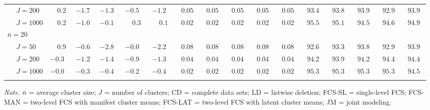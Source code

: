 \begin{sidewaystable}
\begin{threeparttable}
\begin{tabular}{llccccccccccccccc}
 & \nopagebreak $\;J=200$  & $\phantom{-}0.2\phantom{0}$ & ${-}1.7\phantom{0}$ & ${-}1.3\phantom{0}$ & ${-}0.5\phantom{0}$ & ${-}1.2\phantom{0}$ & $\phantom{0}0.05\phantom{0}$ & $\phantom{0}0.05\phantom{0}$ & $\phantom{0}0.05\phantom{0}$ & $\phantom{0}0.05\phantom{0}$ & $\phantom{0}0.05\phantom{0}$ & $\phantom{0}93.4\phantom{0}$ & $\phantom{0}93.8\phantom{0}$ & $\phantom{0}93.9\phantom{0}$ & $\phantom{0}92.9\phantom{0}$ & $\phantom{0}93.9\phantom{0}$ \\
 & \nopagebreak $\;J=1000$  & $\phantom{-}0.2\phantom{0}$ & ${-}1.0\phantom{0}$ & ${-}0.1\phantom{0}$ & $\phantom{-}0.3\phantom{0}$ & $\phantom{-}0.1\phantom{0}$ & $\phantom{0}0.02\phantom{0}$ & $\phantom{0}0.02\phantom{0}$ & $\phantom{0}0.02\phantom{0}$ & $\phantom{0}0.02\phantom{0}$ & $\phantom{0}0.02\phantom{0}$ & $\phantom{0}95.5\phantom{0}$ & $\phantom{0}95.1\phantom{0}$ & $\phantom{0}94.5\phantom{0}$ & $\phantom{0}94.6\phantom{0}$ & $\phantom{0}94.9\phantom{0}$ \\
\multicolumn{4}{l}{$\bar{n}=20$} \\  & \nopagebreak $\;J=50$  & $\phantom{-}0.9\phantom{0}$ & ${-}0.6\phantom{0}$ & ${-}2.8\phantom{0}$ & ${-}0.0\phantom{0}$ & ${-}2.2\phantom{0}$ & $\phantom{0}0.08\phantom{0}$ & $\phantom{0}0.08\phantom{0}$ & $\phantom{0}0.08\phantom{0}$ & $\phantom{0}0.08\phantom{0}$ & $\phantom{0}0.08\phantom{0}$ & $\phantom{0}92.6\phantom{0}$ & $\phantom{0}93.3\phantom{0}$ & $\phantom{0}93.8\phantom{0}$ & $\phantom{0}92.9\phantom{0}$ & $\phantom{0}93.9\phantom{0}$ \\
 & \nopagebreak $\;J=200$  & ${-}0.3\phantom{0}$ & ${-}1.2\phantom{0}$ & ${-}1.4\phantom{0}$ & ${-}0.9\phantom{0}$ & ${-}1.3\phantom{0}$ & $\phantom{0}0.04\phantom{0}$ & $\phantom{0}0.04\phantom{0}$ & $\phantom{0}0.04\phantom{0}$ & $\phantom{0}0.04\phantom{0}$ & $\phantom{0}0.04\phantom{0}$ & $\phantom{0}94.2\phantom{0}$ & $\phantom{0}93.9\phantom{0}$ & $\phantom{0}94.2\phantom{0}$ & $\phantom{0}94.4\phantom{0}$ & $\phantom{0}94.4\phantom{0}$ \\
 & \nopagebreak $\;J=1000$  & ${-}0.0\phantom{0}$ & ${-}0.3\phantom{0}$ & ${-}0.4\phantom{0}$ & ${-}0.2\phantom{0}$ & ${-}0.4\phantom{0}$ & $\phantom{0}0.02\phantom{0}$ & $\phantom{0}0.02\phantom{0}$ & $\phantom{0}0.02\phantom{0}$ & $\phantom{0}0.02\phantom{0}$ & $\phantom{0}0.02\phantom{0}$ & $\phantom{0}95.3\phantom{0}$ & $\phantom{0}95.3\phantom{0}$ & $\phantom{0}95.3\phantom{0}$ & $\phantom{0}95.3\phantom{0}$ & $\phantom{0}94.5\phantom{0}$ \\
[0.5ex]\hline\\[-1.6ex] 
\end{tabular}
\begin{tablenotes}{\footnotesize \textit{Note.} $\bar{n}$ = average cluster size; $J$ = number of clusters; CD = complete data sets; LD = listwise deletion; FCS-SL = single-level FCS; FCS-MAN = two-level FCS with manifest cluster means; FCS-LAT = two-level FCS with latent cluster means; JM = joint modeling.}\end{tablenotes}
\end{threeparttable}
\end{sidewaystable}
